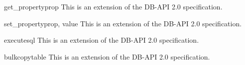 \begin{methoddesc}[Connection]{get_property}{prop}
This is an extension of the DB-API 2.0 specification.
\end{methoddesc}

\begin{methoddesc}[Connection]{set_property}{prop, value}
This is an extension of the DB-API 2.0 specification.
\end{methoddesc}

\begin{methoddesc}[Connection]{execute}{sql}
This is an extension of the DB-API 2.0 specification.
\end{methoddesc}

\begin{methoddesc}[Connection]{bulkcopy}{table }
This is an extension of the DB-API 2.0 specification.
\end{methoddesc}
